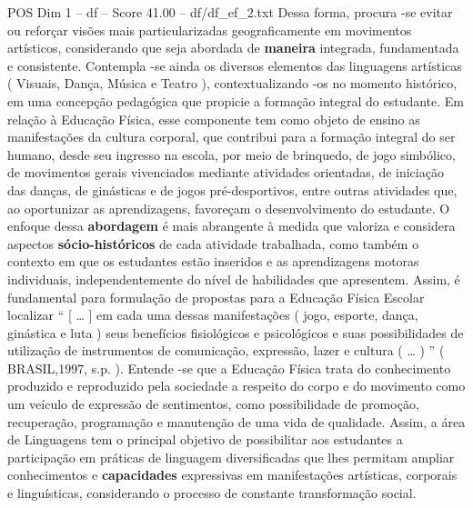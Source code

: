 \begin{textsample}{POS Dim 1 – df – Score 41.00 – df/df\_ef\_2.txt}
Dessa forma, procura -se evitar ou reforçar visões mais particularizadas geograficamente em movimentos artísticos, considerando que seja abordada de \textbf{maneira} integrada, fundamentada e consistente.
Contempla -se ainda os diversos elementos das linguagens artísticas ( Visuais, Dança, Música e Teatro ), contextualizando -os no momento histórico, em uma concepção pedagógica que propicie a formação integral do estudante.
Em relação à Educação Física, esse componente tem como objeto de ensino as manifestações da cultura corporal, que contribui para a formação integral do ser humano, desde seu ingresso na escola, por meio de brinquedo, de jogo simbólico, de movimentos gerais vivenciados mediante atividades orientadas, de iniciação das danças, de ginásticas e de jogos pré-desportivos, entre outras atividades que, ao oportunizar as aprendizagens, favoreçam o desenvolvimento do estudante.
O enfoque dessa \textbf{abordagem} é mais abrangente à medida que valoriza e considera aspectos \textbf{sócio-históricos} de cada atividade trabalhada, como também o contexto em que os estudantes estão inseridos e as aprendizagens motoras individuais, independentemente do nível de habilidades que apresentem.
Assim, é fundamental para formulação de propostas para a Educação Física Escolar localizar “ [ … ] em cada uma dessas manifestações ( jogo, esporte, dança, ginástica e luta ) seus benefícios fisiológicos e psicológicos e suas possibilidades de utilização de instrumentos de comunicação, expressão, lazer e cultura ( … ) ” ( BRASIL,1997, s.p. ).
Entende -se que a Educação Física trata do conhecimento produzido e reproduzido pela sociedade a respeito do corpo e do movimento como um veículo de expressão de sentimentos, como possibilidade de promoção, recuperação, programação e manutenção de uma vida de qualidade.
Assim, a área de Linguagens tem o principal objetivo de possibilitar aos estudantes a participação em práticas de linguagem diversificadas que lhes permitam ampliar conhecimentos e \textbf{capacidades} expressivas em manifestações artísticas, corporais e linguísticas, considerando o processo de constante transformação social.

\end{textsample}
